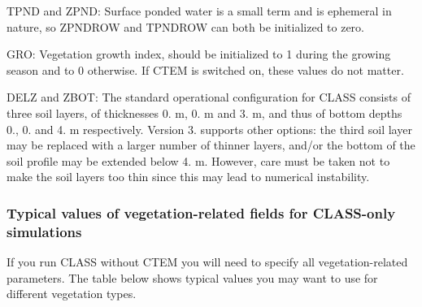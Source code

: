 \begin{DoxyItemize}
\item T\+P\+N\+D and Z\+P\+N\+D\+: Surface ponded water is a small term and is ephemeral in nature, so Z\+P\+N\+D\+R\+O\+W and T\+P\+N\+D\+R\+O\+W can both be initialized to zero.
\item G\+R\+O\+: Vegetation growth index, should be initialized to 1 during the growing season and to 0 otherwise. If C\+T\+E\+M is switched on, these values do not matter.
\item D\+E\+L\+Z and Z\+B\+O\+T\+: The standard operational configuration for C\+L\+A\+S\+S consists of three soil layers, of thicknesses 0. m, 0. m and 3. m, and thus of bottom depths 0., 0. and 4. m respectively. Version 3. supports other options\+: the third soil layer may be replaced with a larger number of thinner layers, and/or the bottom of the soil profile may be extended below 4. m. However, care must be taken not to make the soil layers too thin since this may lead to numerical instability.
\end{DoxyItemize}\hypertarget{index_classvals}{}\subsubsection{Typical values of vegetation-\/related fields for C\+L\+A\+S\+S-\/only simulations}\label{index_classvals}
If you run C\+L\+A\+S\+S without C\+T\+E\+M you will need to specify all vegetation-\/related parameters. The table below shows typical values you may want to use for different vegetation types.

